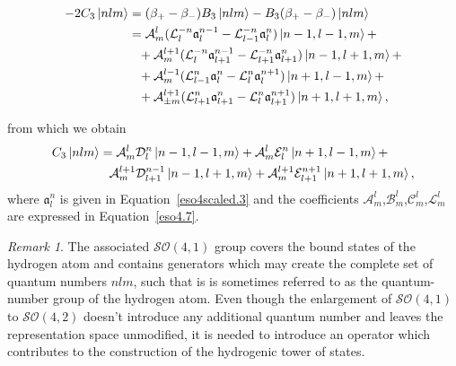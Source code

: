\documentclass[12pt,a4paper]{report}
\theoremstyle{definition}
\theoremstyle{remark}
\newtheorem*{remark}{Remark}
\theoremstyle{remark}
\begin{document}
\begin{align*}
-2C_3\ket{nlm}&=(\beta_+-\beta_-)B_3\ket{nlm}-B_3(\beta_+-\beta_-)\ket{nlm}\\
&=\mathcal{A}_{m}^{l}(\mathcal{L}_l^{-n}\mathfrak{a}_l^{n-1}-\mathcal{L}_{l-1}^{-n}\mathfrak{a}_l^n)\ket{n-1,l-1,m}+\\
&\phantom{=}+ \mathcal{A}_{m}^{l+1}(\mathcal{L}_{l}^{-n}\mathfrak{a}_{l+1}^{n-1}-\mathcal{L}_{l+1}^{-n}\mathfrak{a}_{l+1}^{n})\ket{n-1,l+1,m}+\\
&\phantom{=}+ \mathcal{A}_{m}^{l-1}(\mathcal{L}_{l-1}^{n}\mathfrak{a}_l^{n}-\mathcal{L}_{l}^{n}\mathfrak{a}_l^{n+1})\ket{n+1,l-1,m}+\\
&\phantom{=}+ \mathcal{A}_{\pm m}^{l+1}(\mathcal{L}_{l+1}^{n}\mathfrak{a}_{l+1}^{n}-\mathcal{L}_{l}^{n}\mathfrak{a}_{l+1}^{n+1})\ket{n+1,l+1,m},
\end{align*}

from which we obtain
\begin{align*}
C_3\ket{nlm}&=\mathcal{A}_{m}^{l}\mathcal{D}_l^n\ket{n-1,l-1,m}+ \mathcal{A}_{m}^{l}\mathcal{E}_l^n\ket{n+1,l-1,m}+\\
&\phantom{=}\mathcal{A}_{m}^{l+1}\mathcal{D}_{l+1}^{n-1}\ket{n-1,l+1,m}+\mathcal{A}_{m}^{l+1}\mathcal{E}_{l+1}^{n+1}\ket{n+1,l+1,m},
\end{align*}
where $\mathfrak{a}_l^n$ is given in Equation~\ref{eso4scaled.3} and the coefficients $\mathcal{A}_m^l$,$\mathcal{B}_m^l$,$\mathcal{C}_m^l$,$\mathcal{L}_m^l$ are expressed in Equation~\ref{eso4.7}.

\begin{remark}
The associated $\mathcal{SO}(4,1)$ group covers the bound states of the hydrogen atom and contains generators which may create the complete set of quantum numbers $nlm$, such that is is sometimes referred to as the quantum-number group of the hydrogen atom. Even though the enlargement of $\mathcal{SO}(4,1)$ to $\mathcal{SO}(4,2)$ doesn't introduce any additional quantum number and leaves the representation space unmodified, it is needed to introduce an operator which contributes to the construction of the hydrogenic tower of states. 
\end{remark}
\end{document}
